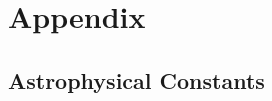 \chapter{Appendix}

\section{Astrophysical Constants}

\newcommand{\va}{\boldsymbol{a}}
\newcommand{\vb}{\boldsymbol{b}}
\newcommand{\vc}{\boldsymbol{c}}
\newcommand{\vd}{\boldsymbol{d}}

\newcommand{\vA}{\boldsymbol{A}}
\newcommand{\vB}{\boldsymbol{B}}
\newcommand{\vn}{\boldsymbol{n}}
\newcommand{\vl}{\boldsymbol{l}}

\newcommand{\ux}{\boldsymbol{\hat{x}}}
\newcommand{\uy}{\boldsymbol{\hat{y}}}
\newcommand{\uz}{\boldsymbol{\hat{z}}}
\newcommand{\urh}{\boldsymbol{\hat{\rho}}}
\newcommand{\up}{\boldsymbol{\hat{\phi}}}
\newcommand{\urr}{\boldsymbol{\hat{r}}}
\newcommand{\ut}{\boldsymbol{\hat{\theta}}}
\newcommand{\st}{\sin{\theta}}
\newcommand{\boldT}{\boldsymbol{T}}

